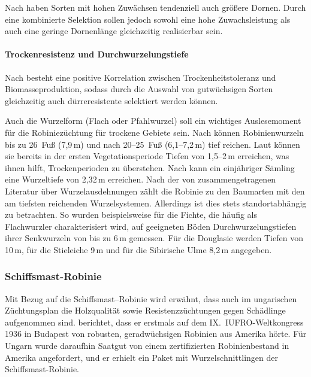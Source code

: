 \documentclass[twocolumn]{scrartcl}
\begin{document}
Nach \citet{bloes1992robinie,mebrahtu1989robinie} haben Sorten mit
hohen Zuwächsen tendenziell auch größere Dornen. Durch eine
kombinierte Selektion sollen jedoch sowohl eine hohe Zuwachsleistung
als auch eine geringe Dornenlänge gleichzeitig realisierbar sein.

\paragraph{Trockenresistenz und Durchwurzelungstiefe}

Nach \citet{guse2011robinie} besteht eine positive Korrelation
zwischen Trockenheitstoleranz und Biomasseproduktion, sodass durch die
Auswahl von gutwüchsigen Sorten gleichzeitig auch dürreresistente
selektiert werden können.

Auch die Wurzelform (Flach oder Pfahlwurzel) soll ein wichtiges Auslesemoment
für die Robiniezüchtung für trockene Gebiete sein.
Nach \citet{bunger1938robinieWurzeltiefe} können Robinienwurzeln
bis zu 26~Fuß (7{,}9\,m) und nach
\citet[S.~424]{harlow2000dendrology} 20--25~Fuß (6,1--7,2\,m) tief reichen.
Laut \citet{lyr1967wurzel}
können sie bereits in der ersten Vegetationsperiode Tiefen von
1{,}5--2\,m erreichen, was ihnen hilft, Trockenperioden zu überstehen.
Nach \citet[S.~38]{bluemke1955robinie} kann ein einjähriger Sämling eine
Wurzeltiefe von 2,32\,m erreichen.
Nach der von \citet{stone1991wurzel} zusammengetragenen Literatur über
Wurzelausdehnungen zählt die Robinie zu den Baumarten mit den am
tiefsten reichenden Wurzelsystemen. Allerdings ist dies stets
standortabhängig zu betrachten. So wurden beispielsweise für die
Fichte, die häufig als Flachwurzler charakterisiert wird, auf
geeigneten Böden Durchwurzelungstiefen ihrer Senkwurzeln von bis zu
6\,m gemessen. Für die Douglasie werden Tiefen von 10\,m, für die
Stieleiche 9\,m und für die Sibirische Ulme 8{,}2\,m angegeben.

\subsubsection{Schiffsmast-Robinie}

Mit Bezug auf die Schiffsmast--Robinie \citep{raber1936shipmast} wird
erwähnt, dass auch im ungarischen Züchtungsplan die Holzqualität sowie
Resistenzzüchtungen gegen Schädlinge aufgenommen sind.
\citet{mihalyi1937robinie} berichtet, dass er erstmals auf dem
IX.~IUFRO-Weltkongress 1936 in Budapest von robusten, geradwüchsigen
Robinien aus Amerika hörte. Für Ungarn wurde daraufhin Saatgut von
einem zertifizierten Robinienbestand in Amerika angefordert, und er
erhielt ein Paket mit Wurzelschnittlingen der Schiffsmast-Robinie.
\end{document}
